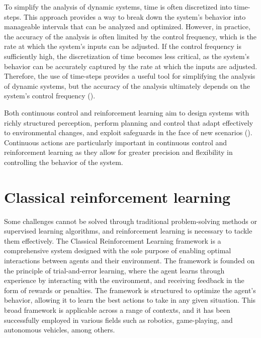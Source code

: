 To simplify the analysis of dynamic systems, time is often discretized into time-steps. This approach provides a way to break down the system's behavior into manageable intervals that can be analyzed and optimized. However, in practice, the accuracy of the analysis is often limited by the control frequency, which is the rate at which the system's inputs can be adjusted. If the control frequency is sufficiently high, the discretization of time becomes less critical, as the system's behavior can be accurately captured by the rate at which the inputs are adjusted. Therefore, the use of time-steps provides a useful tool for simplifying the analysis of dynamic systems, but the accuracy of the analysis ultimately depends on the system's control frequency (\cite{franklin_feedback_2014}).

Both continuous control and reinforcement learning aim to design systems with richly structured perception, perform planning and control that adapt effectively to environmental changes, and exploit safeguards in the face of new scenarios (\cite{recht_tour_2018}). Continuous actions are particularly important in continuous control and reinforcement learning as they allow for greater precision and flexibility in controlling the behavior of the system.

\section{Classical reinforcement learning}

Some challenges cannot be solved through traditional problem-solving methods or supervised learning algorithms, and reinforcement learning is necessary to tackle them effectively. 
The Classical Reinforcement Learning framework is a comprehensive system designed with the sole purpose of enabling optimal interactions between agents and their environment. The framework is founded on the principle of trial-and-error learning, where the agent learns through experience by interacting with the environment, and receiving feedback in the form of rewards or penalties. The framework is structured to optimize the agent's behavior, allowing it to learn the best actions to take in any given situation. This broad framework is applicable across a range of contexts, and it has been successfully employed in various fields such as robotics, game-playing, and autonomous vehicles, among others.

